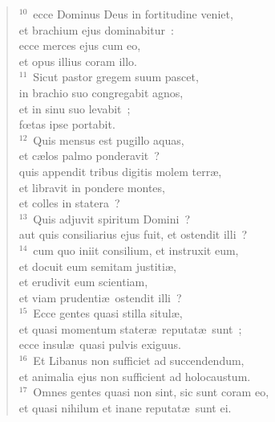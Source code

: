 \begin{flushleft}
\begin{verse}
${}^{10}$~ecce Dominus Deus in fortitudine veniet,\\ et brachium ejus dominabitur~:\\ ecce merces ejus cum eo,\\ et opus illius coram illo.\\
${}^{11}$~Sicut pastor gregem suum pascet,\\ in brachio suo congregabit agnos,\\ et in sinu suo levabit~;\\ fœtas ipse portabit.\\
${}^{12}$~Quis mensus est pugillo aquas,\\ et c\ae los palmo ponderavit~?\\ quis appendit tribus digitis molem terr\ae ,\\ et libravit in pondere montes,\\ et colles in statera~?\\
${}^{13}$~Quis adjuvit spiritum Domini~?\\ aut quis consiliarius ejus fuit, et ostendit illi~?\\
${}^{14}$~cum quo iniit consilium, et instruxit eum,\\ et docuit eum semitam justiti\ae ,\\ et erudivit eum scientiam,\\ et viam prudenti\ae\ ostendit illi~?\\
${}^{15}$~Ecce gentes quasi stilla situl\ae ,\\ et quasi momentum stater\ae\ reputat\ae\ sunt~;\\ ecce insul\ae\ quasi pulvis exiguus.\\
${}^{16}$~Et Libanus non sufficiet ad succendendum,\\ et animalia ejus non sufficient ad holocaustum.\\
${}^{17}$~Omnes gentes quasi non sint, sic sunt coram eo,\\ et quasi nihilum et inane reputat\ae\ sunt ei.\end{verse}\end{flushleft}



